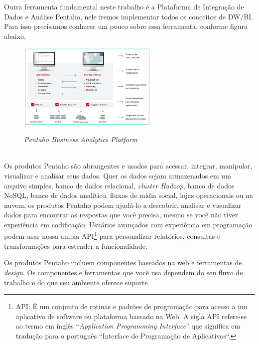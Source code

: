 Outra ferramenta fundamental neste trabalho \'{e} a Plataforma de Integra\c{c}\~{a}o de Dados e An\'{a}lise Pentaho, nele iremos implementar todos os conceitos de DW/BI. Para isso precisamos conhecer um pouco sobre essa ferramenta, conforme figura abaixo.

\begin{figure}[H]
	\vspace*{0,2cm}
    \centering
    \caption{\textit{Pentaho Business Analytics Platform}}
    \includegraphics[width=0.6\textwidth]{./04-figuras/figura-15}
    \label{fig:ilustfig15}
\end{figure}
\vspace*{-0,9cm}
{\raggedright {}}\\

Os produtos Pentaho s\~{a}o abrangentes e usados para acessar, integrar, manipular, visualizar e analisar seus dados. 
Quer os dados sejam armazenados em um arquivo simples, banco de dados relacional, \textit{cluster Hadoop}, banco de dados 
NoSQL, banco de dados anal\'{i}tico, fluxos de m\'{i}dia social, lojas operacionais ou na nuvem, os produtos Pentaho 
podem ajud\'{a}-lo a descobrir, analisar e visualizar dados para encontrar as respostas que você precisa, mesmo se 
você n\~{a}o tiver experiência em codifica\c{c}\~{a}o. 
Usu\'{a}rios avan\c{c}ados com experiência em programa\c{c}\~{a}o podem usar nossa ampla API\footnote{API: 
Ë um conjunto de rotinas e padr\~{o}es de programa\c{c}\~{a}o para acesso a um aplicativo de software ou plataforma 
baseado na Web. A sigla API refere-se ao termo em inglês ``\textit{Application Programming Interface}'' que 
significa em tradu\c{c}\~{a}o para o português ``Interface de Programa\c{c}\~{a}o de Aplicativos``.} para personalizar 
relat\'orios, consultas e transforma\c{c}\~{o}es para estender a funcionalidade.

Os produtos Pentaho incluem componentes baseados na web e ferramentas de \textit{design}. Os componentes e 
ferramentas que você usa dependem do seu fluxo de trabalho e do que seu ambiente oferece suporte

